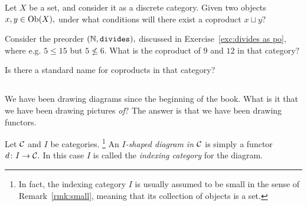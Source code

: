 \documentclass[../main/CT4S-EN-RU]{subfiles}
\begin{document}
\begin{exerciseRUS}
\end{exerciseRUS}

\begin{exerciseENG}
Let $X$ be a set, and consider it as a discrete category. Given two objects $x,y\in\operatorname{Ob}(X),$ under what conditions will there exist a coproduct $x\sqcup y?$
\end{exerciseENG}

\begin{exerciseRUS}
\end{exerciseRUS}

\begin{exerciseENG}
Consider the preorder $({\mathbb N},{\tt divides}),$ discussed in Exercise~\ref{exc:divides as po}, where e.g. $5\leq 15$ but $5\not\leq 6.$ \sexc What is the coproduct of $9$ and $12$ in that category?
\item Is there a standard name for coproducts in that category?
\endsexc
\end{exerciseENG}

\begin{exerciseRUS}
\end{exerciseRUS}


\subsection{}\label{sec:diagrams in a category}

\begin{blockENG}
We have been drawing diagrams since the beginning of the book. What is it that we have been drawing pictures {\em of}? The answer is that we have been drawing functors.
\end{blockENG}

\begin{blockRUS}
\end{blockRUS}

\begin{definitionENG}
Let $\mathcal{C}$ and $I$ be categories.
\footnote{In fact, the indexing category $I$ is usually assumed to be small in the sense of Remark~\ref{rmk:small}, meaning that its collection of objects is a set.}
An {\em $I$-shaped diagram in $\mathcal{C}$} is simply a functor $d\colon I\rightarrow\mathcal{C}.$ In this case $I$ is called the {\em indexing category} for the diagram.
\end{definitionENG}
\end{document}
